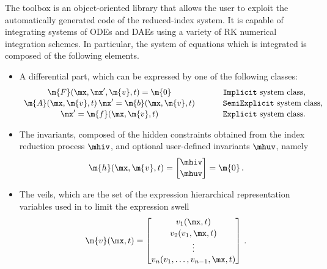 The \Indigo{} \Matlab{} toolbox is an object-oriented library that allows the user to exploit the automatically generated code of the reduced-index system. It is capable of integrating systems of \acp{ODE} and \acp{DAE} using a variety of \ac{RK} numerical integration schemes. In particular, the system of equations which is integrated is composed of the following elements.
%
\begin{itemize}
  \setlength{\itemsep}{0pt}
    \item A differential part, which can be expressed by one of the following classes:
    \begin{equation*}
        \begin{array}{ccl}
            \m{F}(\mx, \mx^\prime, \m{v}, t) = \m{0} & \hspace{0.5cm} &
            \text{\texttt{Implicit} system class,} \\[0.5mm]
            \m{A}(\mx, \m{v}, t) \, \mx^\prime = \m{b}(\mx, \m{v}, t) & \hspace{0.5cm} &
            \text{\texttt{SemiExplicit} system class,} \\[0.5mm]
            \mx^\prime = \m{f}(\mx, \m{v}, t) & \hspace{0.5cm} &
            \text{\texttt{Explicit} system class.}
        \end{array}
    \end{equation*}
    \item The invariants, composed of the hidden constraints obtained from the index reduction process $\mhiv$, and optional user-defined invariants $\mhuv$, namely
    \begin{equation*}
      \m{h}(\mx, \m{v}, t) = \begin{bmatrix}
          \mhiv \\[0.5mm]
          \mhuv
      \end{bmatrix} = \m{0} \, \text{.}
    \end{equation*}
    \item The veils, which are the set of the expression hierarchical representation variables used in \LEM{} to limit the expression swell
    \begin{equation*}
        \m{v}(\mx, t) = \begin{bmatrix}
            v_{1}(\mx, t) \\[0.5mm]
            v_{2}(v_{1}, \mx, t) \\
            \vdots \\
            v_{n}(v_{1}, \dots, v_{n-1}, \mx, t)
        \end{bmatrix} \, \text{.}
    \end{equation*}
\end{itemize}

